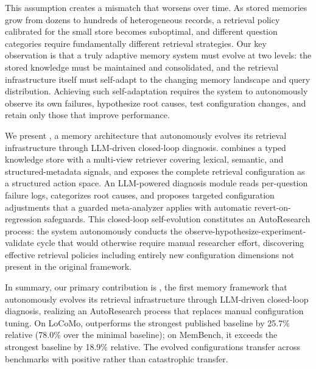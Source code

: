 This assumption creates a mismatch that worsens over time. As stored memories grow from dozens to hundreds of heterogeneous records, a retrieval policy calibrated for the small store becomes suboptimal, and different question categories require fundamentally different retrieval strategies. Our key observation is that a truly adaptive memory system must evolve at two levels: the stored knowledge must be maintained and consolidated, and the retrieval infrastructure itself must self-adapt to the changing memory landscape and query distribution. Achieving such self-adaptation requires the system to autonomously observe its own failures, hypothesize root causes, test configuration changes, and retain only those that improve performance.

We present \ours{}, a memory architecture that autonomously evolves its retrieval infrastructure through LLM-driven closed-loop diagnosis. \ours{} combines a typed knowledge store with a multi-view retriever covering lexical, semantic, and structured-metadata signals, and exposes the complete retrieval configuration as a structured action space. An LLM-powered diagnosis module reads per-question failure logs, categorizes root causes, and proposes targeted configuration adjustments that a guarded meta-analyzer applies with automatic revert-on-regression safeguards. This closed-loop self-evolution constitutes an AutoResearch process: the system autonomously conducts the observe-hypothesize-experiment-validate cycle that would otherwise require manual researcher effort, discovering effective retrieval policies including entirely new configuration dimensions not present in the original framework.

In summary, our primary contribution is \ours{}, the first memory framework that autonomously evolves its retrieval infrastructure through LLM-driven closed-loop diagnosis, realizing an AutoResearch process that replaces manual configuration tuning. On LoCoMo, \ours{} outperforms the strongest published baseline by 25.7\% relative (78.0\% over the minimal baseline); on MemBench, it exceeds the strongest baseline by 18.9\% relative. The evolved configurations transfer across benchmarks with positive rather than catastrophic transfer.
